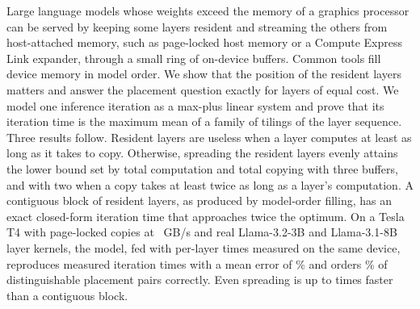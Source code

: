Large language models whose weights exceed the memory of a graphics processor can be served by keeping some layers resident and streaming the others from host-attached memory, such as page-locked host memory or a Compute Express Link expander, through a small ring of on-device buffers. Common tools fill device memory in model order. We show that the position of the resident layers matters and answer the placement question exactly for layers of equal cost. We model one inference iteration as a max-plus linear system and prove that its iteration time is the maximum mean of a family of tilings of the layer sequence. Three results follow. Resident layers are useless when a layer computes at least as long as it takes to copy. Otherwise, spreading the resident layers evenly attains the lower bound set by total computation and total copying with three buffers, and with two when a copy takes at least twice as long as a layer's computation. A contiguous block of resident layers, as produced by model-order filling, has an exact closed-form iteration time that approaches twice the optimum. On a Tesla T4 with page-locked copies at \nHwBw~GB/s and real Llama-3.2-3B and Llama-3.1-8B layer kernels, the model, fed with per-layer times measured on the same device, reproduces \nAccN{} measured iteration times with a mean error of \nAccMape\% and orders \nAccRankExact\% of distinguishable placement pairs correctly. Even spreading is up to \nMeasPenaltyMax{} times faster than a contiguous block.
